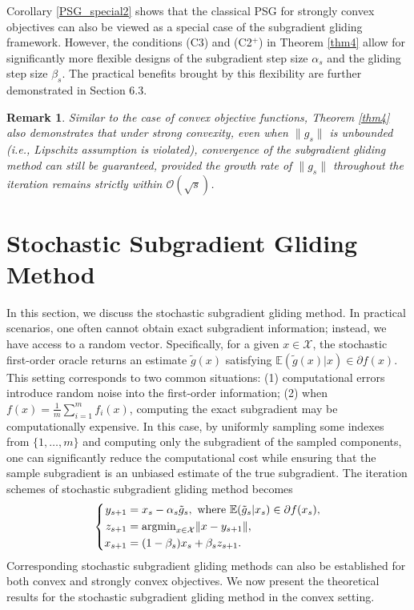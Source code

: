 \documentclass[sn-mathphys]{JORSC-jnl}%
\theoremstyle{thmstyleone}%
\newtheorem{remark}{Remark}[section]%
\theoremstyle{thmstylethree}%
\def\argmin{{\rm argmin}}
\begin{document}
	Corollary \ref{PSG_special2} shows that the classical PSG for strongly convex objectives can also be viewed as a special case of the subgradient gliding framework. However, the conditions (C3) and (C2$^+$) in Theorem \ref{thm4} allow for significantly more flexible designs of the subgradient step size $\alpha_s$ and the gliding step size $\beta_s$. The practical benefits brought by this flexibility are further demonstrated in Section 6.3.
	
	\begin{remark}
		Similar to the case of convex objective functions, Theorem \ref{thm4} also demonstrates that under strong convexity, even when $\|g_s\|$ is unbounded (i.e., Lipschitz assumption is violated), convergence of the subgradient gliding method can still be guaranteed, provided the growth rate of $\|g_s\|$ throughout the iteration remains strictly within $\mathcal{O}(\sqrt{s})$.
	\end{remark}
	
\section{Stochastic Subgradient Gliding Method}
In this section, we discuss the stochastic subgradient gliding method. In practical scenarios, one often cannot obtain exact subgradient information; instead, we have access to a random vector. Specifically, for a given $x \in \mathcal{X}$, the stochastic first-order oracle returns an estimate $\tilde{g}(x)$ satisfying $\mathbb{E}(\tilde{g}(x) \vert x) \in \partial f(x)$. This setting corresponds to two common situations: (1) computational errors introduce random noise into the first-order information; (2) when $f(x) = \frac{1}{m}\sum_{i=1}^{m} f_i(x)$, computing the exact subgradient may be computationally expensive. In this case, by uniformly sampling some indexes from $\{1,\dots,m\}$ and computing only the subgradient of the sampled components, one can significantly reduce the computational cost while ensuring that the sample subgradient is an unbiased estimate of the true subgradient. The iteration schemes of stochastic subgradient gliding method becomes
\begin{equation*}
	\left\{	\begin{aligned}
		y_{s+1}&=x_s-\alpha_s \tilde{g}_s, ~\text{where } \mathbb{E}(\tilde{g}_s \vert x_s)\in\partial f(x_s),\\
		z_{s+1}&=  \argmin_{x\in\mathcal{X}}\Vert x-y_{s+1} \Vert,\\
		x_{s+1}&= (1-\beta_s)x_s +\beta_s z_{s+1}.	\end{aligned} \right.
\end{equation*}
Corresponding stochastic subgradient gliding methods can also be established for both convex and strongly convex objectives. We now present the theoretical results for the stochastic subgradient gliding method in the convex setting.
\end{document}
